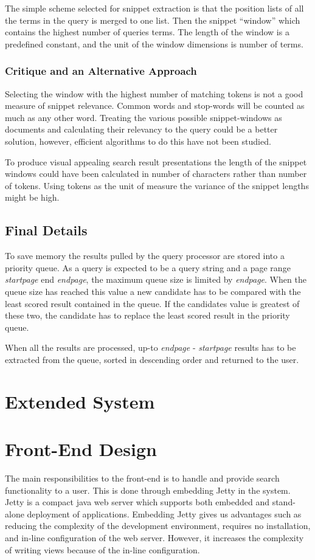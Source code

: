 The simple scheme selected for snippet extraction is that the position lists of all the terms in the query is merged to one list. Then the snippet ``window'' which contains the highest number of queries terms. The length of the window is a predefined constant, and the unit of the window dimensions is number of terms. 

\subsubsection{Critique and an Alternative Approach}
Selecting the window with the highest number of matching tokens is not a good measure of snippet relevance. Common words and stop-words will be counted as much as any other word. Treating the various possible snippet-windows as documents and calculating their relevancy to the query could be a better solution, however, efficient algorithms to do this have not been studied. 

To produce visual appealing search result presentations the length of the snippet windows could have been calculated in number of characters rather than number of tokens. Using tokens as the unit of measure the variance of the snippet lengths might be high. 

\subsection{Final Details}
To save memory the results pulled by the query processor are stored into a priority queue. As a query is expected to be a query string and a page range {\it startpage} end {\it endpage}, the maximum queue size is limited by {\it endpage}. When the queue size has reached this value a new candidate has to be compared with the least scored result contained in the queue. If the candidates value is greatest of these two, the candidate has to replace the least scored result in the priority queue.

When all the results are processed, up-to {\it endpage} - {\it startpage} results has to be extracted from the queue, sorted in descending order and returned to the user.

\section{Extended System}

\section{Front-End Design}
The main responsibilities to the front-end is to handle and provide search functionality to a user. This is done through embedding Jetty in the system. Jetty is a compact java web server which supports both embedded and stand-alone deployment of applications. Embedding Jetty gives us advantages such as reducing the complexity of the development environment, requires no installation, and in-line configuration of the web server. However, it increases the complexity of writing views because of the in-line configuration.


